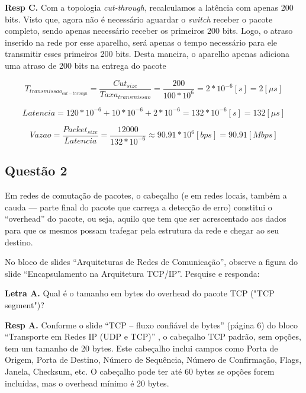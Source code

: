 \textbf{Resp C.} Com a topologia \textit{cut-through}, recalculamos a latência com apenas 200 bits. Visto que, agora não é necessário aguardar o \textit{switch} receber o pacote completo, sendo apenas necessário receber os primeiros 200 bits. Logo, o atraso inserido na rede por esse aparelho, será apenas o tempo necessário para ele transmitir esses primeiros 200 bits. Desta maneira, o aparelho apenas adiciona uma atraso de 200 bits na entrega do pacote

\begin{equation}
	T_{transmissao_{cut-through}} = \frac{Cut_{size}}{Taxa_{transmissao}} = \frac{200}{100 * 10^6} =  2*10^{-6} [s] = 2 [\mu s]
\end{equation}

\begin{equation}
	Latencia = 120 * 10^{-6} + 10 * 10^{-6} + 2*10^{-6} = 132 * 10^{-6} [s] = 132 [\mu s]
\end{equation}

\begin{equation}
	Vazao = \frac{Packet_{size}}{Latencia} = \frac{12000}{132 * 10^{-6}} \approx 90.91 * 10^6 [bps] = 90.91 [Mbps]
\end{equation}
\newline

\subsection{Questão 2}

Em redes de comutação de pacotes, o cabeçalho (e em redes locais, também a cauda — parte final do pacote que carrega a detecção de erro) constitui o “overhead” do pacote, ou seja, aquilo que tem que ser acrescentado aos dados para que os mesmos possam trafegar pela estrutura da rede e chegar ao seu destino.

No bloco de slides “Arquiteturas de Redes de Comunicação”, observe a figura do slide “Encapsulamento na Arquitetura TCP/IP”. Pesquise e responda:
\newline

\textbf{Letra A.} Qual é o tamanho em bytes do overhead do pacote TCP ("TCP segment")? 
\newline

\textbf{Resp A.} Conforme o slide “TCP – fluxo confiável de bytes” (página 6) do bloco “Transporte em Redes IP (UDP e TCP)” \autocite{peterson2025redes} , o cabeçalho TCP padrão, sem opções, tem um tamanho de 20 bytes. Este cabeçalho inclui campos como Porta de Origem, Porta de Destino, Número de Sequência, Número de Confirmação, Flags, Janela, Checksum, etc. O cabeçalho pode ter até 60 bytes se opções forem incluídas, mas o overhead mínimo é 20 bytes.
\newline

